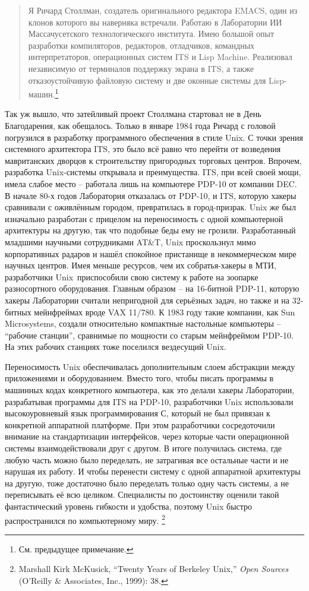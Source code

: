 \begin{quote}
Я Ричард Столлман, создатель оригинального редактора EMACS, один из клонов которого вы наверняка встречали. Работаю в Лаборатории ИИ Массачусетского технологического института. Имею большой опыт разработки компиляторов, редакторов, отладчиков, командных интерпретаторов, операционных систем ITS и Lisp Machine. Реализовал независимую от терминалов поддержку экрана в ITS, а также отказоустойчивую файловую систему и две оконные системы для Lisp-машин.\footnote{См. предыдущее примечание.}
\end{quote}

Так уж вышло, что затейливый проект Столлмана стартовал не в День Благодарения, как обещалось. Только в январе 1984 года Ричард с головой погрузился в разработку программного обеспечения в стиле Unix. С точки зрения системного архитектора ITS, это было всё равно что перейти от возведения мавританских дворцов к строительству пригородных торговых центров. Впрочем, разработка Unix-системы открывала и преимущества. ITS, при всей своей мощи, имела слабое место -- работала лишь на компьютере PDP-10 от компании DEC. В начале 80-х годов Лаборатория отказалась от PDP-10, и ITS, которую хакеры сравнивали с оживлённым городом, превратилась в город-призрак. Unix же был изначально разработан с прицелом на переносимость с одной компьютерной архитектуры на другую, так что подобные беды ему не грозили. Разработанный младшими научными сотрудниками AT\&T, Unix проскользнул мимо корпоративных радаров и нашёл спокойное пристанище в некоммерческом мире научных центров. Имея меньше ресурсов, чем их собратья-хакеры в МТИ, разработчики Unix приспособили свою систему к работе на зоопарке разносортного оборудования. Главным образом -- на 16-битной PDP-11, которую хакеры Лаборатории считали непригодной для серьёзных задач, но также и на 32-битных мейнфреймах вроде VAX 11/780. К 1983 году такие компании, как Sun Microsystems, создали относительно компактные настольные компьютеры -- \enquote{рабочие станции}, сравнимые по мощности со старым мейнфреймом PDP-10. На этих рабочих станциях тоже поселился вездесущий Unix.

Переносимость Unix обеспечивалась дополнительным слоем абстракции между приложениями и оборудованием. Вместо того, чтобы писать программы в машинных кодах конкретного компьютера, как это делали хакеры Лаборатории, разрабатывая программы для ITS на PDP-10, разработчики Unix использовали высокоуровневый язык программирования С, который не был привязан к конкретной аппаратной платформе. При этом разработчики сосредоточили внимание на стандартизации интерфейсов, через которые части операционной системы взаимодействовали друг с другом. В итоге получилась система, где любую часть можно было переделать, не затрагивая все остальные части и не нарушая их работу. И чтобы перенести систему с одной аппаратной архитектуры на другую, тоже достаточно было переделать только одну часть системы, а не переписывать её всю целиком. Специалисты по достоинству оценили такой фантастический уровень гибкости и удобства, поэтому Unix быстро распространился по компьютерному миру. \footnote{Marshall Kirk McKusick, \enquote{Twenty Years of Berkeley Unix,} \textit{Open Sources} (O'Reilly \& Associates, Inc., 1999): 38.}

